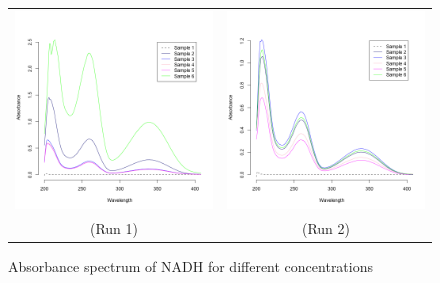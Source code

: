 \documentclass[a4paper,11pt]{article}
\begin{document}
        \begin{figure}[H]
            \centering
            \begin{tabular}{cc}
                \includegraphics[width=200px]{../resources/absorption_r1_spectrum.png} &
                \includegraphics[width=200px]{../resources/absorption_r2_spectrum.png} \\
                (Run 1) & (Run 2)\\
            \end{tabular}
            \caption{Absorbance spectrum of NADH for different concentrations}
            \label{fig:abs_spectrum}
        \end{figure}
\end{document}
